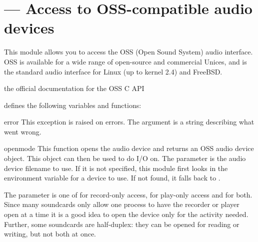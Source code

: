 \section{ ---
         Access to OSS-compatible audio devices}


This module allows you to access the OSS (Open Sound System) audio
interface.  OSS is available for a wide range of open-source and
commercial Unices, and is the standard audio interface for Linux (up to
kernel 2.4) and FreeBSD.

\begin{seealso}
         {the official documentation for the OSS C API}
\end{seealso}

 defines the following variables and functions:

\begin{excdesc}{error}
This exception is raised on errors.  The argument is a string describing
what went wrong.
\end{excdesc}

\begin{funcdesc}{open}{mode}
This function opens the audio device and returns an OSS audio device
object.  This object can then be used to do I/O on.  The 
parameter is the audio device filename to use.  If it is not specified,
this module first looks in the environment variable  for
a device to use.  If not found, it falls back to .

The  parameter is one of  for record-only access,
 for play-only access and  for both.  Since many
soundcards only allow one process to have the recorder or player open at
a time it is a good idea to open the device only for the activity
needed.  Further, some soundcards are half-duplex: they can be opened
for reading or writing, but not both at once.
\end{funcdesc}

